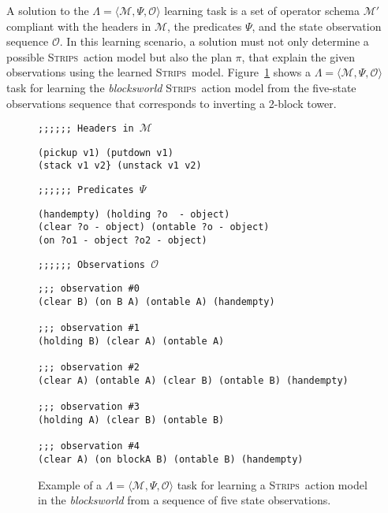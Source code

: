 \documentclass[3p,times]{elsarticle}
\newcommand{\strips}{\textsc{Strips}}     %
\newcommand{\tup}[1]{{\langle #1 \rangle}}
\begin{document}
A solution to the $\Lambda=\tup{\mathcal{M},\Psi,\mathcal{O}}$ learning task is a set of operator schema $\mathcal{M}'$ compliant with the headers in $\mathcal{M}$, the predicates $\Psi$, and the state observation sequence $\mathcal{O}$. In this learning scenario, a solution must not only determine a possible \strips\ action model but also the plan $\pi$, that explain the given observations using the learned \strips\ model. Figure~\ref{fig:example-observations} shows a $\Lambda=\tup{\mathcal{M},\Psi,\mathcal{O}}$ task for learning the {\em blocksworld} \strips\ action model from the five-state observations sequence that corresponds to inverting a 2-block tower.

\begin{figure}[hbt!]
{\footnotesize\tt ;;;;;; Headers in $\mathcal{M}$}
\begin{footnotesize}
\begin{verbatim}
(pickup v1) (putdown v1)
(stack v1 v2} (unstack v1 v2)
\end{verbatim}
\end{footnotesize}
\vspace{0.2cm}
{\footnotesize\tt ;;;;;; Predicates $\Psi$}
\begin{footnotesize}
\begin{verbatim}
(handempty) (holding ?o  - object)
(clear ?o - object) (ontable ?o - object)
(on ?o1 - object ?o2 - object)
\end{verbatim}
\end{footnotesize}
\vspace{0.2cm}
{\footnotesize\tt ;;;;;; Observations $\mathcal{O}$}
\begin{footnotesize}
\begin{verbatim}
;;; observation #0
(clear B) (on B A) (ontable A) (handempty)

;;; observation #1
(holding B) (clear A) (ontable A)

;;; observation #2
(clear A) (ontable A) (clear B) (ontable B) (handempty)

;;; observation #3
(holding A) (clear B) (ontable B)

;;; observation #4
(clear A) (on blockA B) (ontable B) (handempty)
\end{verbatim}
\end{footnotesize}
 \caption{\small Example of a $\Lambda=\tup{\mathcal{M},\Psi,\mathcal{O}}$ task for learning a \strips\ action model in the {\em blocksworld} from a sequence of five state observations.}
\label{fig:example-observations}
\end{figure}
\end{document}
